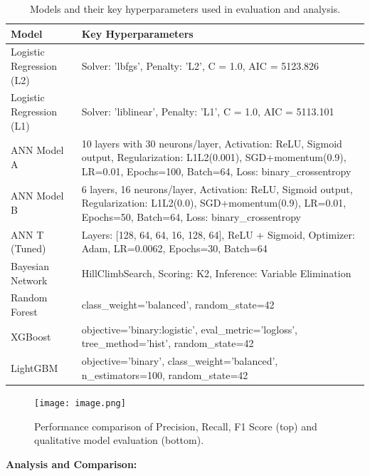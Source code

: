 \documentclass[conference]{IEEEtran}
\begin{document}
\begin{table}[htbp]
  \centering
    \caption{Models and their key hyperparameters used in evaluation and analysis.}
  \renewcommand{\arraystretch}{1.3}
  \begin{tabular}{|p{3.5cm}|p{3cm}|}
    \hline
    \textbf{Model} & \textbf{Key Hyperparameters} \\
    \hline
    Logistic Regression (L2) & Solver: 'lbfgs', Penalty: 'L2', C = 1.0, AIC = 5123.826 \\
    \hline
    Logistic Regression (L1) & Solver: 'liblinear', Penalty: 'L1', C = 1.0, AIC = 5113.101 \\
    \hline
    ANN Model A & 10 layers with 30 neurons/layer, Activation: ReLU, Sigmoid output, Regularization: L1L2(0.001), SGD+momentum(0.9), LR=0.01, Epochs=100, Batch=64, Loss: binary\_crossentropy \\
    \hline
    ANN Model B & 6 layers, 16 neurons/layer, Activation: ReLU, Sigmoid output, Regularization: L1L2(0.0), SGD+momentum(0.9), LR=0.01, Epochs=50, Batch=64, Loss: binary\_crossentropy \\
    \hline
    ANN T (Tuned) & Layers: [128, 64, 64, 16, 128, 64], ReLU + Sigmoid, Optimizer: Adam, LR=0.0062, Epochs=30, Batch=64 \\
    \hline
    Bayesian Network & HillClimbSearch, Scoring: K2, Inference: Variable Elimination \\
    \hline
    Random Forest & class\_weight='balanced', random\_state=42 \\
    \hline
    XGBoost & objective='binary:logistic', eval\_metric='logloss', tree\_method='hist', random\_state=42 \\
    \hline
    LightGBM & objective='binary', class\_weight='balanced', n\_estimators=100, random\_state=42 \\
    \hline
  \end{tabular}
  \label{tab:model_params}
\end{table}


\vspace{1em}

\begin{figure}[htbp]
  \centering
  \texttt{[image: image.png]}
  \caption{Performance comparison of Precision, Recall, F1 Score (top) and qualitative model evaluation (bottom).}
  \label{fig:combined_perf_summary}
\end{figure}


\vspace{4em}
\noindent \textbf{Analysis and Comparison:}\\
\end{document}
